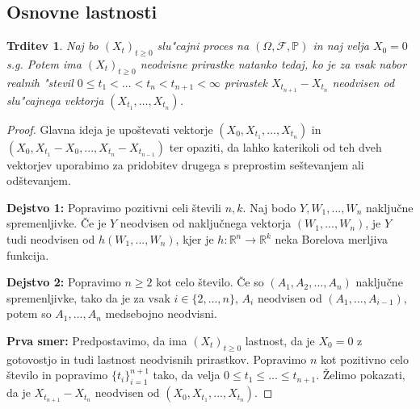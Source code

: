 \documentclass[12pt, a4paper, reqno]{amsart}
\theoremstyle{definition}
\theoremstyle{plain}
\newtheorem{trditev}[definicija]{Trditev}
\newcommand{\F}{\mathcal{F}}
\newcommand{\1}{\mathds{1}}
\begin{document}
    \subsection{Osnovne lastnosti}

        \begin{trditev}
            Naj bo $(X_t)_{t\geq0}$ slu"cajni proces na $(\Omega, \F, \mathbb{P})$ in naj velja $X_0 = 0$ s.g.
            Potem ima $(X_t)_{t\geq0}$
            neodvisne prirastke natanko tedaj, ko je za vsak nabor realnih "stevil 
            $0 \leq t_1 < \ldots < t_n < t_{n+1} <\infty$ prirastek $X_{t_{n+1}} - X_{t_n}$ neodvisen od
            slu"cajnega vektorja $(X_{t_1}, \dots, X_{t_n})$.
            \label{trd:ekvivKarakterizacija}
        \end{trditev}

        \begin{proof}
            Glavna ideja je upoštevati vektorje $(X_0, X_{t_1}, ..., X_{t_n})$ in $(X_0, X_{t_1}-X_0, ..., X_{t_n}-X_{t_{n-1}})$ ter opaziti, da lahko katerikoli od teh dveh vektorjev uporabimo za pridobitev drugega s preprostim seštevanjem ali odštevanjem.

            \textbf{Dejstvo 1:} Popravimo pozitivni celi števili $n, k$. Naj bodo $Y, W_1, ..., W_n$ naključne spremenljivke. Če je $Y$ neodvisen od naključnega vektorja $(W_1, ..., W_n)$, je $Y$ tudi neodvisen od $h(W_1, ..., W_n)$, kjer je $h:\mathbb{R}^n\rightarrow\mathbb{R}^k$ neka Borelova merljiva funkcija.

            \textbf{Dejstvo 2:} Popravimo $n\geq 2$ kot celo število. Če so $(A_1, A_2, ..., A_n)$ naključne spremenljivke, tako da je za vsak $i \in \{2, ..., n\}$, $A_i$ neodvisen od $(A_1, ..., A_{i-1})$, potem so $A_1, ..., A_n$ medsebojno neodvisni.

            \textbf{Prva smer:}
            Predpostavimo, da ima $(X_t)_{t\geq 0}$ lastnost, da je $X_0=0$ z gotovostjo in tudi lastnost neodvisnih prirastkov. Popravimo $n$ kot pozitivno celo število in popravimo $\{t_i\}_{i=1}^{n+1}$ tako, da velja $0\leq t_1\leq ... \leq t_{n+1}$. Želimo pokazati, da je $X_{t_{n+1}}-X_{t_n}$ neodvisen od $(X_0,X_{t_1}, ..., X_{t_n})$.


\end{proof}
\end{document}
